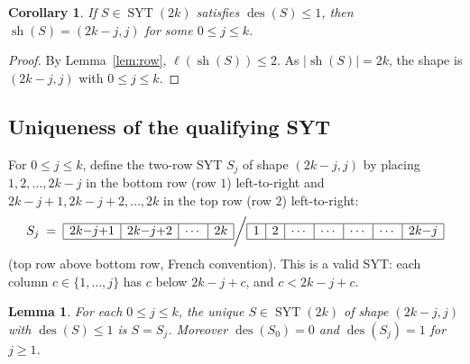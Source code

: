 \documentclass[11pt]{article}
\newtheorem{lemma}[theorem]{Lemma}
\newtheorem{corollary}[theorem]{Corollary}
\theoremstyle{definition}
\theoremstyle{remark}
\DeclareMathOperator{\des}{des}
\DeclareMathOperator{\sh}{sh}
\DeclareMathOperator{\SYT}{SYT}
\begin{document}
\begin{corollary}\label{cor:two-row}
If $S \in \SYT(2k)$ satisfies $\des(S) \le 1$, then $\sh(S) = (2k-j, j)$ for
some $0 \le j \le k$.
\end{corollary}

\begin{proof}
By Lemma~\ref{lem:row}, $\ell(\sh(S)) \le 2$. As $|\sh(S)| = 2k$, the shape
is $(2k-j, j)$ with $0 \le j \le k$.
\end{proof}

\subsection*{Uniqueness of the qualifying SYT}

For $0 \le j \le k$, define the two-row SYT $S_j$ of shape $(2k-j, j)$ by
placing $1, 2, \ldots, 2k-j$ in the bottom row (row $1$) left-to-right and
$2k-j+1, 2k-j+2, \ldots, 2k$ in the top row (row $2$) left-to-right:
\[
    S_j \;=\;
    \begin{array}{|c|c|c|c|}
    \hline
    2k{-}j{+}1 & 2k{-}j{+}2 & \cdots & 2k \\
    \hline
    \end{array}
    \bigg\slash
    \begin{array}{|c|c|c|c|c|c|c|}
    \hline
    1 & 2 & \cdots & \cdots & \cdots & \cdots & 2k{-}j \\
    \hline
    \end{array}
\]
(top row above bottom row, French convention). This is a valid SYT: each
column $c \in \{1,\ldots,j\}$ has $c$ below $2k-j+c$, and $c < 2k-j+c$.

\begin{lemma}\label{lem:unique-SYT}
For each $0 \le j \le k$, the unique $S \in \SYT(2k)$ of shape $(2k-j, j)$
with $\des(S) \le 1$ is $S = S_j$. Moreover $\des(S_0) = 0$ and $\des(S_j) = 1$
for $j \ge 1$.
\end{lemma}
\end{document}
